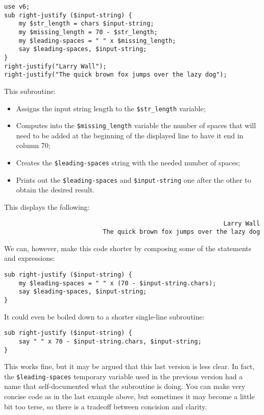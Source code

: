 \begin{verbatim}
use v6;
sub right-justify ($input-string) {
    my $str_length = chars $input-string;
    my $missing_length = 70 - $str_length;
    my $leading-spaces = " " x $missing_length;
    say $leading-spaces, $input-string;
}
right-justify("Larry Wall");
right-justify("The quick brown fox jumps over the lazy dog");
\end{verbatim}

This subroutine:
\begin{itemize}
\item Assigns the input string length to the \verb'$str_length' variable;
\item Computes into the \verb'$missing_length' variable the 
number of spaces that will need to be added at the beginning 
of the displayed line to have it end in column 70;
\item Creates the \verb'$leading-spaces' string with the 
needed number of spaces;
\item Prints out the \verb'$leading-spaces' and 
\verb'$input-string' one after the other to obtain the desired 
result.
\end{itemize}

This displays the following:

\begin{verbatim}
                                                            Larry Wall
                           The quick brown fox jumps over the lazy dog
\end{verbatim}

We can, however, make this code shorter by composing some of the 
statements and expressions:

\begin{verbatim}
sub right-justify ($input-string) {
    my $leading-spaces = " " x (70 - $input-string.chars);
    say $leading-spaces, $input-string;
}
\end{verbatim}

It could even be boiled down to a shorter single-line subroutine:

\begin{verbatim}
sub right-justify ($input-string) {
    say " " x 70 - $input-string.chars, $input-string;
}
\end{verbatim}

This works fine, but it may be argued that this last version is 
less clear. In fact, the \verb'$leading-spaces' temporary 
variable used in the previous version had a name that 
self-documented what the subroutine is doing. You can make 
very concise code as in the last example above, but sometimes 
it may become a little bit too terse, so there is a tradeoff 
between concision and clarity.

